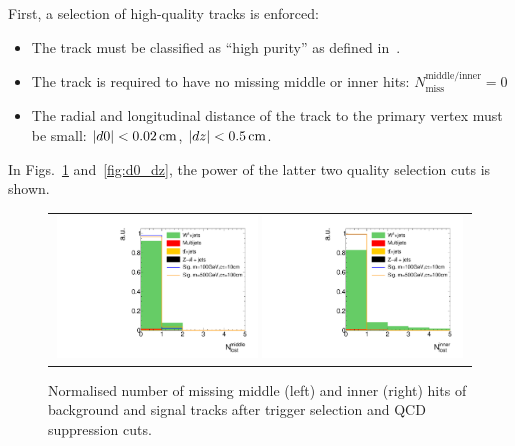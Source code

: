 First, a selection of high-quality tracks is enforced:
\begin{itemize}
\renewcommand{\labelitemi}{\footnotesize{\ding{118}}}
\item The track must be classified as ``high purity'' as defined in~\cite{bib:CMS:Tracking_2010}.
\item The track is required to have no missing middle or inner hits: $N_{\text{miss}}^{\text{middle/inner}}=0$
\item The radial and longitudinal  distance of the track to the primary vertex must be small: \mbox{$|d0|<0.02\,\text{cm}$}, \mbox{$|dz|<0.5\,\text{cm}$}.
\end{itemize}
In Figs.~\ref{fig:LostHits} and~\ref{fig:d0_dz}, the power of the latter two quality selection cuts is shown.\\
\begin{figure}[!t]
  \centering 
  \begin{tabular}{c}
    \includegraphics[width=0.49\textwidth]{figures/analysis/AnalysisSelection/chiTracksQCDsupressionTrigger_2Signals_FullBkg/htrackNLostMid_lin.pdf}
    \includegraphics[width=0.49\textwidth]{figures/analysis/AnalysisSelection/chiTracksQCDsupressionTrigger_2Signals_FullBkg/htrackNLostInner_lin.pdf}
  \end{tabular}
  \caption{Normalised number of missing middle (left) and inner (right) hits of background and signal tracks after trigger selection and QCD suppression cuts.}
  \label{fig:LostHits}
\end{figure}
